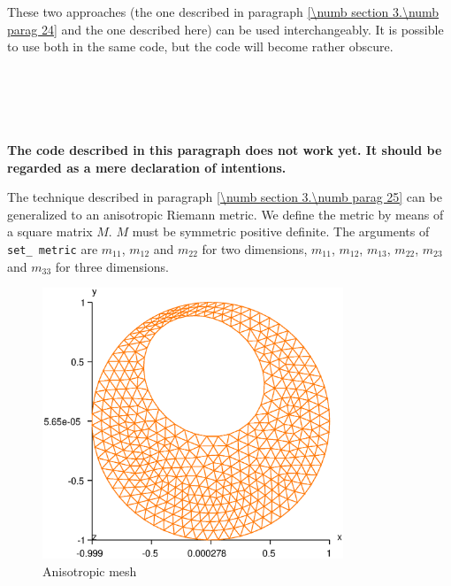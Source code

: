 These two approaches (the one described in paragraph \ref{\numb section 3.\numb parag 24} and
the one described here) can be used interchangeably.
It is possible to use both in the same code, but the code will become rather obscure.


\section{~~}\label{\numb section 3.\numb parag 26}

{\normalfont\bfseries The code described in this paragraph does not work yet.
It should be regarded as a mere declaration of intentions.}
\medskip

The technique described in paragraph \ref{\numb section 3.\numb parag 25} can be generalized to
an anisotropic Riemann metric.
We define the metric by means of a square matrix $M$.
$M$ must be symmetric positive definite.
The arguments of {\small\tt set\_\,metric} are $ m_{11} $, $ m_{12} $ and $ m_{22} $
for two dimensions,
$ m_{11} $, $ m_{12} $, $ m_{13} $, $ m_{22} $, $ m_{23} $ and $ m_{33} $ for three dimensions.

\begin{figure}[ht] \centering
 \includegraphics[width=90mm]{disk-anisotrop}
  \caption{Anisotropic mesh}
  \label{\numb section 3.\numb fig 14}
\end{figure}

